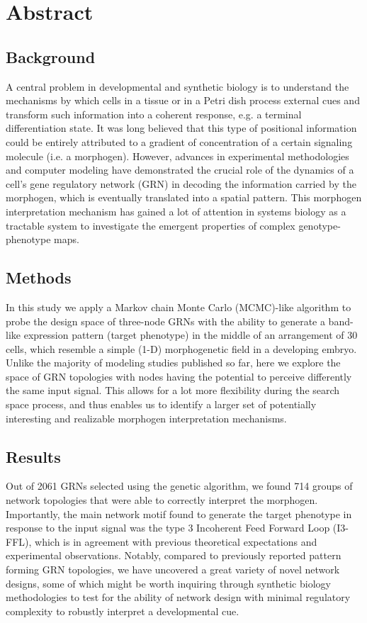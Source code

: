 \documentclass[10pt,letterpaper]{article}
\begin{document}
\section*{Abstract}

\subsection*{Background}
A central problem in developmental and synthetic biology is to understand the
mechanisms by which cells in a tissue or in a Petri dish process external cues
and transform such information into a coherent response, e.g. a terminal
differentiation state. It was long believed that this type of positional
information could be entirely attributed to a gradient of concentration of a
certain signaling molecule (i.e. a morphogen). However, advances in experimental
methodologies and computer modeling have demonstrated the crucial role of the
dynamics of a cell's gene regulatory network (GRN) in decoding the information
carried by the morphogen, which is eventually translated into a spatial
pattern. This morphogen interpretation mechanism has gained a lot of attention
in systems biology as a tractable system to investigate the emergent properties
of complex genotype-phenotype maps.

\subsection*{Methods}
In this study we apply a Markov chain Monte Carlo (MCMC)-like algorithm to probe
the design space of three-node GRNs with the ability to generate a band-like
expression pattern (target phenotype) in the middle of an arrangement of 30
cells, which resemble a simple (1-D) morphogenetic field in a developing embryo.
Unlike the majority of modeling studies published so far, here we explore the
space of GRN topologies with nodes having the potential to perceive differently
the same input signal. This allows for a lot more flexibility during the search
space process, and thus enables us to identify a larger set of potentially
interesting and realizable morphogen interpretation mechanisms.

\subsection*{Results}
Out of 2061 GRNs selected using the genetic algorithm, we found 714 groups of
network topologies that were able to correctly interpret the morphogen.
Importantly, the main network motif found to generate the target phenotype in
response to the input signal was the type 3 Incoherent Feed Forward Loop (I3-FFL),
which is in agreement with previous theoretical expectations and experimental
observations. Notably, compared to previously reported pattern forming GRN
topologies, we have uncovered a great variety of novel network designs, some of
which might be worth inquiring through synthetic biology methodologies to test
for the ability of network design with minimal regulatory complexity to robustly
interpret a developmental cue.
\end{document}
